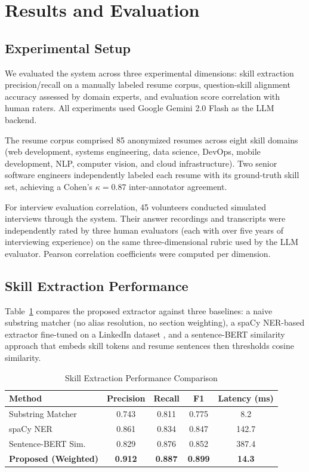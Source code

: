 \documentclass[conference]{IEEEtran}
\begin{document}
\section{Results and Evaluation}
\label{sec:results}

\subsection{Experimental Setup}

We evaluated the system across three experimental dimensions: skill extraction precision/recall on a manually labeled resume corpus, question-skill alignment accuracy assessed by domain experts, and evaluation score correlation with human raters. All experiments used Google Gemini 2.0 Flash as the LLM backend.

The resume corpus comprised 85 anonymized resumes across eight skill domains (web development, systems engineering, data science, DevOps, mobile development, NLP, computer vision, and cloud infrastructure). Two senior software engineers independently labeled each resume with its ground-truth skill set, achieving a Cohen's $\kappa = 0.87$ inter-annotator agreement.

For interview evaluation correlation, 45 volunteers conducted simulated interviews through the system. Their answer recordings and transcripts were independently rated by three human evaluators (each with over five years of interviewing experience) on the same three-dimensional rubric used by the LLM evaluator. Pearson correlation coefficients were computed per dimension.

\subsection{Skill Extraction Performance}

Table~\ref{tab:comparison} compares the proposed extractor against three baselines: a naive substring matcher (no alias resolution, no section weighting), a spaCy NER-based extractor fine-tuned on a LinkedIn dataset \cite{zhang2022skill}, and a sentence-BERT similarity approach that embeds skill tokens and resume sentences then thresholds cosine similarity.

\begin{table}[htbp]
\caption{Skill Extraction Performance Comparison}
\label{tab:comparison}
\centering
\begin{tabular}{lcccc}
\toprule
\textbf{Method} & \textbf{Precision} & \textbf{Recall} & \textbf{F1} & \textbf{Latency (ms)} \\
\midrule
Substring Matcher    & 0.743 & 0.811 & 0.775 & 8.2 \\
spaCy NER \cite{zhang2022skill}  & 0.861 & 0.834 & 0.847 & 142.7 \\
Sentence-BERT Sim.  & 0.829 & 0.876 & 0.852 & 387.4 \\
\textbf{Proposed (Weighted)} & \textbf{0.912} & \textbf{0.887} & \textbf{0.899} & \textbf{14.3} \\
\bottomrule
\end{tabular}
\end{table}
\end{document}
